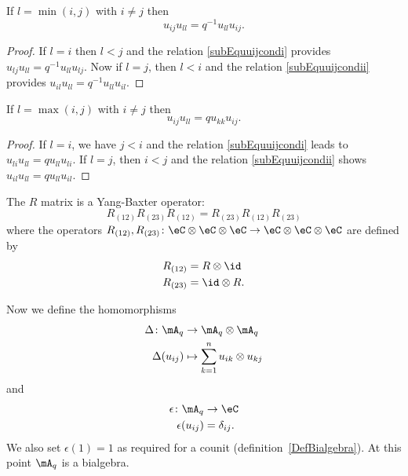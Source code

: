 \begin{lemma}       \label{lestmunijdiff}
	If $l=\min(i,j)$ with $i\neq j$ then
	\begin{equation}
		u_{ij}u_{ll}=q^{-1}u_{ll}u_{ij}.
	\end{equation}
\end{lemma}

\begin{proof}
	If $l=i$ then $l<j$ and the relation \eqref{subEquuijcondi} provides $u_{lj}u_{ll}=q^{-1}u_{ll}u_{lj}$. Now if $l=j$, then $l<i$ and the relation \eqref{subEquuijcondii} provides $u_{il}u_{ll}=q^{-1}u_{ll}u_{il}$.
\end{proof}


\begin{lemma}       \label{lestmaxjdiff}
	If $l=\max(i,j)$ with $i\neq j$ then
	\begin{equation}
		u_{ij}u_{ll}=qu_{kk}u_{ij}.
	\end{equation}
\end{lemma}

\begin{proof}
	If $l=i$, we have $j<i$ and the relation \eqref{subEquuijcondi} leads to $u_{li}u_{ll}=qu_{ll}u_{li}$. If $l=j$, then $i<j$ and the relation \eqref{subEquuijcondii} shows $u_{il}u_{ll}=qu_{ll}u_{il}$.
\end{proof}


The $R$ matrix is a Yang-Baxter operator:
\begin{equation}
	R_{(12)}R_{(23)}R_{(12)}=R_{(23)}R_{(12)}R_{(23)}
\end{equation}
where the operators $R_{(12)},R_{(23)}\colon \eC\otimes\eC\otimes\eC\to \eC\otimes\eC\otimes\eC$ are defined by
\begin{equation}
	\begin{aligned}[]
		R_{(12)} & =R\otimes \id  \\
		R_{(23)} & =\id\otimes R.
	\end{aligned}
\end{equation}

Now we define the homomorphisms
\begin{equation}
	\begin{aligned}
		\Delta\colon \mA_q & \to \mA_q\otimes\mA_q                    \\
		\Delta(u_{ij})     & \mapsto \sum_{k=1}^nu_{ik}\otimes u_{kj}
	\end{aligned}
\end{equation}
and
\begin{equation}
	\begin{aligned}
		\epsilon\colon \mA_q & \to \eC       \\
		\epsilon(u_{ij})     & =\delta_{ij}.
	\end{aligned}
\end{equation}
We also set \( \epsilon(1)=1\) as required for a counit (definition~\ref{DefBialgebra}). At this point $\mA_q$ is a bialgebra.


